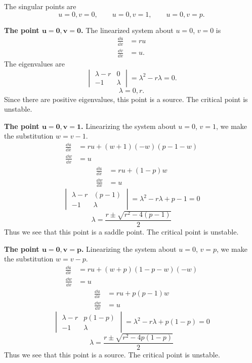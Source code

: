 \begin{Solution}
  The singular points are
  \[ u=0, v=0, \qquad u=0, v=1, \qquad u=0, v=p. \]

  \textbf{The point $\mathbf{u = 0, v = 0}$.}
  The linearized system about $u=0$, $v=0$ is 
  \begin{align*}
    \frac{\dd u}{\dd x} &= r u \\
    \frac{\dd v}{\dd x} &= u.
  \end{align*}
  The eigenvalues are
  \[
  \begin{vmatrix}
    \lambda-r    &       0       \\
    -1              &       \lambda
  \end{vmatrix}
  = \lambda^2 - r \lambda = 0.
  \]
  \[ \lambda = 0, r. \]
  Since there are positive eigenvalues, this point is a source.  The critical 
  point is unstable.

  \textbf{The point $\mathbf{u = 0, v = 1}$.}
  Linearizing the system about $u=0$, $v = 1$, we make the substitution
  $w = v-1$.
  \begin{align*}
    \frac{\dd u}{\dd x} &= r u + (w+1)(-w)(p-1-w) \\
    \frac{\dd w}{\dd x} &= u
  \end{align*}
  \begin{align*}
    \frac{\dd u}{\dd x} &= r u + (1-p) w \\
    \frac{\dd w}{\dd x} &= u
  \end{align*}
  \[ 
  \begin{vmatrix}
    \lambda-r    &       (p-1)   \\
    -1              &       \lambda
  \end{vmatrix}
  = \lambda^2 - r \lambda + p -1 = 0 \]
  \[ \lambda = \frac{r \pm \sqrt{r^2 - 4 (p-1)}}{2} \]
  Thus we see that this point is a saddle point.
  The critical point is unstable.


  \textbf{The point $\mathbf{u = 0, v = p}$.}
  Linearizing the system about $u=0$, $v=p$, we make the substitution
  $w=v-p$.
  \begin{align*}
    \frac{\dd u}{\dd x} &= r u + (w+p)(1-p-w)(-w) \\
    \frac{\dd w}{\dd x} &= u
  \end{align*}
  \begin{align*}
    \frac{\dd u}{\dd x} &= r u + p(p-1)w \\
    \frac{\dd w}{\dd x} &= u
  \end{align*}
  \[
  \begin{vmatrix}
    \lambda-r    &       p(1-p)  \\
    -1              &       \lambda
  \end{vmatrix}
  = \lambda^2 - r \lambda + p(1-p) = 0 \]
  \[ \lambda = \frac{r \pm \sqrt{r^2 - 4p(1-p)}}{2} \]
  Thus we see that this point is a source.
  The critical point is unstable.





\end{Solution}
